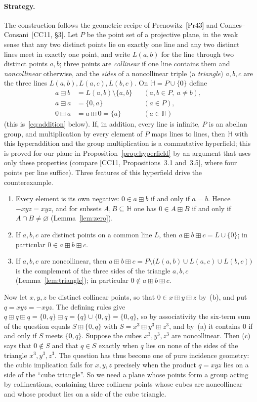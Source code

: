 \documentclass[12pt]{article}
\theoremstyle{plain}
\theoremstyle{definition}
\newcommand{\Hh}{\mathbb{H}}
\newcommand{\bp}{\boxplus}
\begin{document}
\paragraph{Strategy.}
The construction follows the geometric recipe of Prenowitz~[Pr43] and
Connes--Consani~[CC11, \S3].  Let $P$ be the point set of a projective
plane, in the weak sense that any two distinct points lie on exactly one
line and any two distinct lines meet in exactly one point, and write
$L(a,b)$ for the line through two distinct points $a,b$; three points
are \emph{collinear} if one line contains them and \emph{noncollinear}
otherwise, and the \emph{sides} of a noncollinear triple (a
\emph{triangle}) $a,b,c$ are the three lines $L(a,b),L(a,c),L(b,c)$.
On $\Hh=P\cup\{0\}$ define
\[
 \begin{aligned}
 a\bp b&=L(a,b)\setminus\{a,b\} &&(a,b\in P,\ a\neq b),\\
 a\bp a&=\{0,a\} &&(a\in P),\\
 0\bp a&=a\bp0=\{a\} &&(a\in\Hh)
 \end{aligned}
\]
(this is~\eqref{eq:addition} below).  If, in addition, every line is
infinite, $P$ is an abelian group, and
multiplication by every element of $P$ maps lines to lines, then $\Hh$
with this hyperaddition and the group multiplication is a commutative
hyperfield; this is proved for our plane in
Proposition~\ref{prop:hyperfield} by an argument that uses only these
properties (compare [CC11, Propositions~3.1 and~3.5], where four points
per line suffice).  Three features of this hyperfield drive the
counterexample.
\begin{enumerate}
\item[(a)] Every element is its own negative: $0\in a\bp b$ if and only
if $a=b$.  Hence $-xyz=xyz$, and for subsets $A,B\subseteq\Hh$ one has
$0\in A\bp B$ if and only if $A\cap B\neq\varnothing$
(Lemma~\ref{lem:zero}).
\item[(b)] If $a,b,c$ are distinct points on a common line $L$, then
$a\bp b\bp c=L\cup\{0\}$; in particular $0\in a\bp b\bp c$.
\item[(c)] If $a,b,c$ are noncollinear, then
$a\bp b\bp c=P\setminus\bigl(L(a,b)\cup L(a,c)\cup L(b,c)\bigr)$ is
the complement of the three sides of the triangle $a,b,c$
(Lemma~\ref{lem:triangle}); in particular $0\notin a\bp b\bp c$.
\end{enumerate}
Now let $x,y,z$ be distinct collinear points, so that $0\in x\bp y\bp z$
by~(b), and put $q=xyz=-xyz$.  The defining rules give
$q\bp q\bp q=\{0,q\}\bp q=\{q\}\cup\{0,q\}=\{0,q\}$, so by associativity
the six-term sum of the question equals $S\bp\{0,q\}$ with
$S=x^3\bp y^3\bp z^3$, and by~(a) it contains $0$ if and only if $S$
meets $\{0,q\}$.  Suppose the cubes $x^3,y^3,z^3$ are noncollinear.
Then (c) says that $0\notin S$ and that $q\in S$ exactly when $q$ lies
on none of the sides of the triangle $x^3,y^3,z^3$.  The question has
thus become one of pure incidence geometry: the cubic implication fails
for $x,y,z$ precisely when the product $q=xyz$ lies on a side of the
``cube triangle''.  So we need a plane whose points form a group acting
by collineations, containing three collinear points whose cubes are
noncollinear and whose product lies on a side of the cube triangle.
\end{document}
